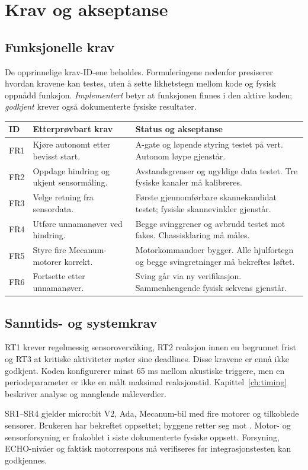 \chapter{Krav og akseptanse}
\label{ch:requirements}
\section{Funksjonelle krav}
De opprinnelige krav-ID-ene beholdes. Formuleringene nedenfor presiserer
hvordan kravene kan testes, uten å sette likhetstegn mellom kode og fysisk
oppnådd funksjon. \emph{Implementert} betyr at funksjonen finnes i den
aktive koden; \emph{godkjent} krever også dokumenterte fysiske resultater.

\begin{tabularx}{\textwidth}{@{}P{12mm}Y Y@{}}
\toprule ID & Etterprøvbart krav & Status og akseptanse\\\midrule
FR1 & Kjøre autonomt etter bevisst start. & A-gate og løpende styring testet på vert. Autonom løype gjenstår.\\
FR2 & Oppdage hindring og ukjent sensormåling. & Avstandsgrenser og ugyldige data testet. Tre fysiske kanaler må kalibreres.\\
FR3 & Velge retning fra sensordata. & Første gjennomførbare skannekandidat testet; fysiske skannevinkler gjenstår.\\
FR4 & Utføre unnamanøver ved hindring. & Begge svinggrener og avbrudd testet mot fakes. Chassisklaring må måles.\\
FR5 & Styre fire Mecanum-motorer korrekt. & Motorkommandoer bygger. Alle hjulfortegn og begge svingretninger må bekreftes løftet.\\
FR6 & Fortsette etter unnamanøver. & Sving går via ny verifikasjon. Sammenhengende fysisk sekvens gjenstår.\\\bottomrule
\end{tabularx}

\section{Sanntids- og systemkrav}
RT1 krever regelmessig sensorovervåking, RT2 reaksjon innen en begrunnet
frist og RT3 at kritiske aktiviteter møter sine deadlines. Disse kravene
er ennå ikke godkjent. Koden konfigurerer minst 65 ms mellom akustiske
triggere, men en periodeparameter er ikke en målt maksimal reaksjonstid.
Kapittel~\ref{ch:timing} beskriver analyse og manglende måleverdier.

SR1--SR4 gjelder micro:bit V2, Ada, Mecanum-bil med fire motorer og
tilkoblede sensorer. Brukeren har bekreftet oppsettet; byggene retter seg
mot . Motor- og sensorforsyning er frakoblet i
siste dokumenterte fysiske oppsett. Forsyning, ECHO-nivåer og faktisk
motorrespons må verifiseres før integrasjonstesten kan godkjennes.

